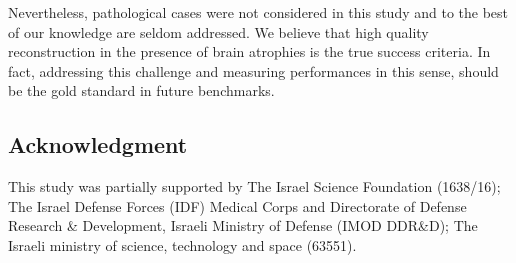\documentclass[review]{elsarticle}
\begin{document}
Nevertheless, pathological cases were not considered in this study and to the best of our knowledge are seldom addressed. We believe that high quality reconstruction in the presence of brain atrophies is the true success criteria. In fact, addressing this challenge and measuring performances in this sense, should be the gold standard in future benchmarks.



\subsection{Acknowledgment}
This study was partially supported by The Israel Science Foundation (1638/16); The Israel Defense Forces (IDF) Medical Corps and Directorate of Defense Research \& Development, Israeli Ministry of Defense (IMOD DDR\&D); The Israeli ministry of science, technology and space (63551).
\end{document}
